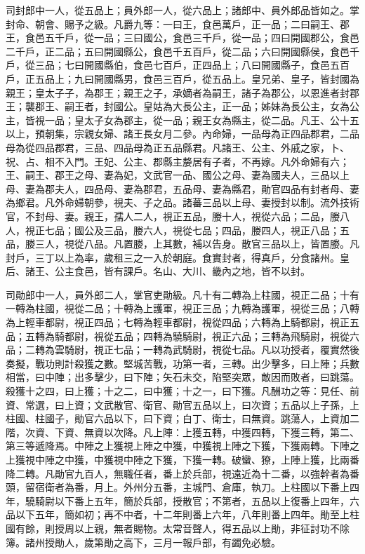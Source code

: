 \begin{pinyinscope}
 司封郎中一人，從五品上；員外郎一人，從六品上；諸郎中、員外郎品皆如之。掌封命、朝會、賜予之級。凡爵九等：一曰王，食邑萬戶，正一品；二曰嗣王、郡王，食邑五千戶，從一品；三曰國公，食邑三千戶，從一品；四曰開國郡公，食邑二千戶，正二品；五曰開國縣公，食邑千五百戶，從二品；六曰開國縣侯，食邑千戶，從三品；七曰開國縣伯，食邑七百戶，正四品上；八曰開國縣子，食邑五百戶，正五品上；九曰開國縣男，食邑三百戶，從五品上。皇兄弟、皇子，皆封國為親王；皇太子子，為郡王；親王之子，承嫡者為嗣王，諸子為郡公，以恩進者封郡王；襲郡王、嗣王者，封國公。皇姑為大長公主，正一品；姊妹為長公主，女為公主，皆視一品；皇太子女為郡主，從一品；親王女為縣主，從二品。凡王、公十五以上，預朝集，宗親女婦、諸王長女月二參。內命婦，一品母為正四品郡君，二品母為從四品郡君，三品、四品母為正五品縣君。凡諸王、公主、外戚之家，卜、祝、占、相不入門。王妃、公主、郡縣主嫠居有子者，不再嫁。凡外命婦有六；王、嗣王、郡王之母、妻為妃，文武官一品、國公之母、妻為國夫人，三品以上母、妻為郡夫人，四品母、妻為郡君，五品母、妻為縣君，勛官四品有封者母、妻為鄉君。凡外命婦朝參，視夫、子之品。諸蕃三品以上母、妻授封以制。流外技術官，不封母、妻。親王，孺人二人，視正五品，媵十人，視從六品；二品，媵八人，視正七品；國公及三品，媵六人，視從七品；四品，媵四人，視正八品；五品，媵三人，視從八品。凡置媵，上其數，補以告身。散官三品以上，皆置媵。凡封戶，三丁以上為率，歲租三之一入於朝庭。食實封者，得真戶，分食諸州。皇后、諸王、公主食邑，皆有課戶。名山、大川、畿內之地，皆不以封。



 司勛郎中一人，員外郎二人，掌官吏勛級。凡十有二轉為上柱國，視正二品；十有一轉為柱國，視從二品；十轉為上護軍，視正三品；九轉為護軍，視從三品；八轉為上輕車都尉，視正四品；七轉為輕車都尉，視從四品；六轉為上騎都尉，視正五品；五轉為騎都尉，視從五品；四轉為驍騎尉，視正六品；三轉為飛騎尉，視從六品；二轉為雲騎尉，視正七品；一轉為武騎尉，視從七品。凡以功授者，覆實然後奏擬，戰功則計殺獲之數。堅城苦戰，功第一者，三轉。出少擊多，曰上陣；兵數相當，曰中陣；出多擊少，曰下陣；矢石未交，陷堅突眾，敵因而敗者，曰跳蕩。殺獲十之四，曰上獲；十之二，曰中獲；十之一，曰下獲。凡酬功之等：見任、前資、常選，曰上資；文武散官、衛官、勛官五品以上，曰次資；五品以上子孫，上柱國、柱國子，勛官六品以下，曰下資；白丁、衛士，曰無資。跳蕩人，上資加二階，次資、下資、無資以次降。凡上陣：上獲五轉，中獲四轉，下獲三轉，第二、第三等遞降焉。中陣之上獲視上陣之中獲，中獲視上陣之下獲，下獲兩轉。下陣之上獲視中陣之中獲，中獲視中陣之下獲，下獲一轉。破蠻、獠，上陣上獲，比兩番降二轉。凡勛官九百人，無職任者，番上於兵部，視遠近為十二番，以強幹者為番頭，留宿衛者為番，月上。外州分五番，主城門、倉庫，執刀。上柱國以下番上四年，驍騎尉以下番上五年，簡於兵部，授散官；不第者，五品以上復番上四年，六品以下五年，簡如初；再不中者，十二年則番上六年，八年則番上四年。勛至上柱國有餘，則授周以上親，無者賜物。太常音聲人，得五品以上勛，非征討功不除簿。諸州授勛人，歲第勛之高下，三月一報戶部，有蠲免必驗。




\end{pinyinscope}
